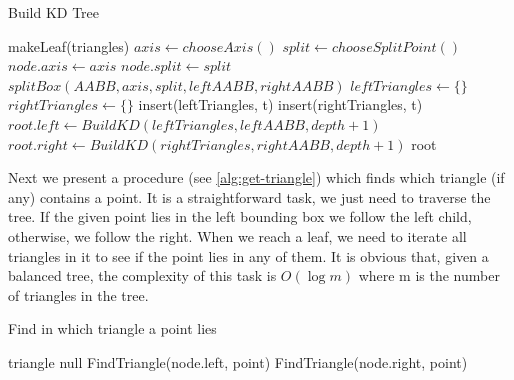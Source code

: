 \begin{algorithm}[H]
\centering
\caption{Build KD Tree}\label{alg:build-kd}
\begin{algorithmic}[1]
				\State \Return makeLeaf(triangles)
			\EndIf
			\State $axis \gets chooseAxis()$
			\State $split \gets chooseSplitPoint()$
			\State $node.axis \gets axis$
			\State $node.split \gets split$
			\State $splitBox(AABB, axis, split, leftAABB, rightAABB)$
			\State $leftTriangles \gets \{\}$
			\State $rightTriangles \gets \{\}$
					\State insert(leftTriangles, t)
				\EndIf
					\State insert(rightTriangles, t)
				\EndIf
			\EndFor
			\State $root.left \gets BuildKD(leftTriangles, leftAABB, depth + 1)$
			\State $root.right \gets BuildKD(rightTriangles, rightAABB, depth + 1)$
			\State \Return root
		\EndProcedure
\end{algorithmic}
\end{algorithm}

Next we present a procedure (see \cref{alg:get-triangle}) which finds which triangle (if any) contains a point. It is a straightforward task, we just need to traverse the tree. If the given point lies in the left bounding box we follow the left child, otherwise, we follow the right. When we reach a leaf, we need to iterate all triangles in it to see if the point lies in any of them. It is obvious that, given a balanced tree, the complexity of this task is $O(\log{m})$ where m is the number of triangles in the tree.

\begin{algorithm}[H]
\centering
\caption{Find in which triangle a point lies}\label{alg:get-triangle}
\begin{algorithmic}[1]
					\State \Return triangle
				\EndIf
			\EndFor
			\Return null
		\EndIf
			\State \Return FindTriangle(node.left, point)
		\Else
			\State \Return FindTriangle(node.right, point)
		\EndIf
	\EndProcedure
\end{algorithmic}
\end{algorithm}

